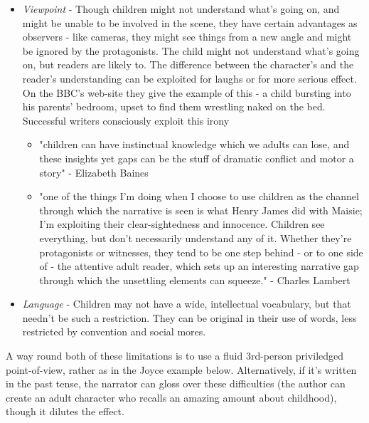 \documentclass[11pt]{article}
\begin{document}
\begin{itemize}
\item \textit{Viewpoint} -  Though children might not understand what's
going on, and might be unable to be involved in the scene, they have
certain advantages as observers - like cameras, they might see things
from a new angle and
might be ignored by the protagonists. The child might not understand
what's going on, but readers are likely to. The difference between
the character's and  the reader's understanding can be
exploited for laughs or for more serious effect.
On the BBC's web-site they give
the example of this - a child bursting into his parents' bedroom, upset to find
them wrestling naked on the bed. Successful writers consciously exploit this
  irony
\begin{itemize}
\item 
"children can have instinctual knowledge which we adults can lose, and these insights yet gaps can be the stuff of dramatic conflict and motor a story" - Elizabeth Baines

\item 
"one of the things I'm doing when I choose to use children as the channel through which the narrative is seen is what Henry James did with Maisie; I'm exploiting their clear-sightedness and innocence. Children see everything, but don't necessarily understand any of it. Whether they're protagonists or witnesses, they tend to be one step behind - or to one side of - the attentive adult reader, which sets up an interesting narrative gap through which the unsettling elements can squeeze." - Charles Lambert

\end{itemize}



\item \textit{Language} -  Children may not have a wide, intellectual
vocabulary, but that needn't be such a restriction. They can be original 
in their use of words, less restricted by convention and social mores.
\end{itemize}
A way round both of these limitations is to use a fluid 3rd-person priviledged point-of-view, rather as in the Joyce example below. Alternatively, if it's written in the past tense, the narrator can gloss over these difficulties (the author can create an adult character who recalls an amazing amount about childhood), though it dilutes the effect.
\end{document}
